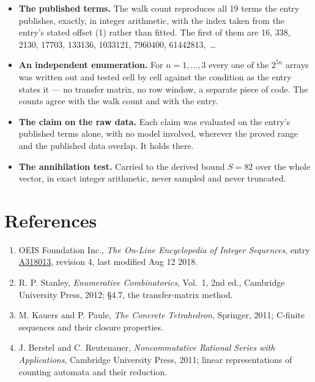 \documentclass[11pt]{article}
\theoremstyle{definition}
\begin{document}
\begin{itemize}

\item {\bfseries The published terms.} The walk count reproduces all 19 terms the entry publishes, exactly, in integer arithmetic, with the index taken from the entry's stated offset (1) rather than fitted. The first of them are 16, 338, 2130, 17703, 133136, 1033121, 7960400, 61442813,~\dots

\item {\bfseries An independent enumeration.} For $n = 1,\dots,3$ every one of the $2^{5n}$ arrays was written out and tested cell by cell against the condition as the entry states it --- no transfer matrix, no row window, a separate piece of code. The counts agree with the walk count and with the entry.

\item {\bfseries The claim on the raw data.} Each claim was evaluated on the entry's published terms alone, with no model involved, wherever the proved range and the published data overlap. It holds there.

\item {\bfseries The annihilation test.} Carried to the derived bound $S = 82$ over the whole vector, in exact integer arithmetic, never sampled and never truncated.

\end{itemize}

\section{References}

\begin{enumerate}

\item OEIS Foundation Inc., \emph{The On-Line Encyclopedia of Integer Sequences}, entry \href{https://oeis.org/A318013}{A318013}, revision 4, last modified Aug 12 2018.

\item R. P. Stanley, \emph{Enumerative Combinatorics}, Vol.~1, 2nd ed., Cambridge University Press, 2012; \S4.7, the transfer-matrix method.

\item M. Kauers and P. Paule, \emph{The Concrete Tetrahedron}, Springer, 2011; C-finite sequences and their closure properties.

\item J. Berstel and C. Reutenauer, \emph{Noncommutative Rational Series with Applications}, Cambridge University Press, 2011; linear representations of counting automata and their reduction.

\end{enumerate}
\end{document}
